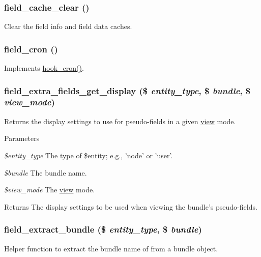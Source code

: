 \hypertarget{group__field_ga48d2c3c37e58251cd5abb49d38f8f039}{
\subsubsection[{field\_\-cache\_\-clear}]{\setlength{\rightskip}{0pt plus 5cm}field\_\-cache\_\-clear ()}}
\label{group__field_ga48d2c3c37e58251cd5abb49d38f8f039}
Clear the field info and field data caches. \hypertarget{group__field_ga146e4e160374875d10cdf1fdcaf688e3}{
\subsubsection[{field\_\-cron}]{\setlength{\rightskip}{0pt plus 5cm}field\_\-cron ()}}
\label{group__field_ga146e4e160374875d10cdf1fdcaf688e3}
Implements \hyperlink{group__hooks_gaf07f1e3d98112fc2ba6920cf7ee6fb16}{hook\_\-cron()}. \hypertarget{group__field_ga3ec2b23abfecffb6a85e203b6233b84b}{
\subsubsection[{field\_\-extra\_\-fields\_\-get\_\-display}]{\setlength{\rightskip}{0pt plus 5cm}field\_\-extra\_\-fields\_\-get\_\-display (\$ {\em entity\_\-type}, \/  \$ {\em bundle}, \/  \$ {\em view\_\-mode})}}
\label{group__field_ga3ec2b23abfecffb6a85e203b6233b84b}
Returns the display settings to use for pseudo-\/fields in a given \hyperlink{classview}{view} mode.


\begin{DoxyParams}{Parameters}
\item[{\em \$entity\_\-type}]The type of \$entity; e.g., 'node' or 'user'. \item[{\em \$bundle}]The bundle name. \item[{\em \$view\_\-mode}]The \hyperlink{classview}{view} mode.\end{DoxyParams}
\begin{DoxyReturn}{Returns}
The display settings to be used when viewing the bundle's pseudo-\/fields. 
\end{DoxyReturn}
\hypertarget{group__field_gade5f766418eabc45894d745b3b4541c4}{
\subsubsection[{field\_\-extract\_\-bundle}]{\setlength{\rightskip}{0pt plus 5cm}field\_\-extract\_\-bundle (\$ {\em entity\_\-type}, \/  \$ {\em bundle})}}
\label{group__field_gade5f766418eabc45894d745b3b4541c4}
Helper function to extract the bundle name of from a bundle object.



